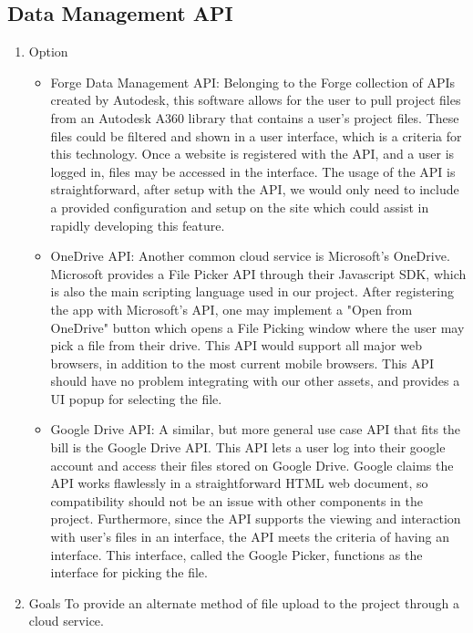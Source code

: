 \documentclass[letterpaper, 10pt, draftclsnofoot, compsoc, onecolumn]{IEEEtran}
\begin{document}
	\subsection{Data Management API}
		\begin{enumerate}
			\item{Option}
				\begin{itemize}
					\item{Forge Data Management API: Belonging to the Forge collection of APIs created by Autodesk, this software allows for the user to pull project files from an Autodesk A360 library that contains a user's project files. These files could be filtered and shown in a user interface, which is a criteria for this technology. Once a website is registered with the API, and a user is logged in, files may be accessed in the interface.  The usage of the API is straightforward, after setup with the API, we would only need to include a provided configuration and setup on the site which could assist in rapidly developing this feature.}
					
					\item{OneDrive API: Another common cloud service is Microsoft's OneDrive. Microsoft provides a File Picker API through their Javascript SDK, which is also the main scripting language used in our project. After registering the app with Microsoft's API, one may implement a "Open from OneDrive" button which opens a File Picking window where the user may pick a file from their drive. This API would support all major web browsers, in addition to the most current mobile browsers. This API should have no problem integrating with our other assets, and provides a UI popup for selecting the file.}

					\item{Google Drive API: A similar, but more general use case API that fits the bill is the Google Drive API. This API lets a user log into their google account and access their files stored on Google Drive. Google claims the API works flawlessly in a straightforward HTML web document, so compatibility should not be an issue with other components in the project. Furthermore, since the API supports the viewing and interaction with user's files in an interface, the API meets the criteria of having an interface. This interface, called the Google Picker, functions as the interface for picking the file.}
					
					
				\end{itemize}
			\item{Goals}
			To provide an alternate method of file upload to the project through a cloud service.
			

\end{enumerate}
\end{document}
